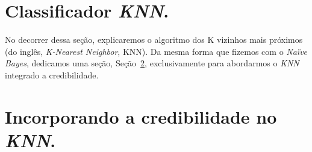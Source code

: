 

\section{Classificador \textit{KNN}.}
\label{subsec::cred_knn}

No decorrer dessa seção, explicaremos o algoritmo dos K vizinhos mais próximos (do inglês, \textit{K-Nearest Neighbor}, KNN). Da mesma forma que fizemos com o \textit{Naïve Bayes}, dedicamos uma seção, Seção~\ref{subsubsec::knn_cred}, exclusivamente para abordarmos o \textit{KNN} integrado a credibilidade. 




\section{Incorporando a credibilidade no \textit{KNN}.}
\label{subsubsec::knn_cred}


